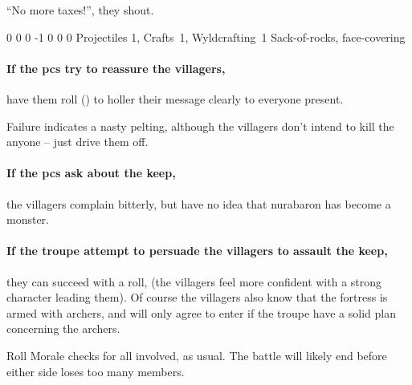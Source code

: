 \begin{multicols}{2}
\begin{boxtext}
  ``No more taxes!'', they shout.
\end{boxtext}

{0}%
{0}%
{{0}%
{-1}%
{0}}%
{0}%
{0}%
{Projectiles 1, Crafts~1, Wyldcrafting~1}%
{Sack-of-rocks, face-covering}%
{}

\paragraph{If the \glspl{pc} try to reassure the villagers,}
have them roll  (\tn[9]) to holler their message clearly to everyone present.

Failure indicates a nasty pelting, although the villagers don't intend to kill the anyone -- just drive them off.

\paragraph{If the \glspl{pc} ask about the keep,}
the villagers complain bitterly, but have no idea that \gls{nurabaron} has become a monster.

\paragraph{If the troupe attempt to persuade the villagers to assault the keep,}
they can succeed with a  roll, \tn[10]
(the villagers feel more confident with a strong character leading them).
Of course the villagers also know that the fortress is armed with archers, and will only agree to enter if the troupe have a solid plan concerning the archers.

Roll Morale checks for all involved, as usual.%
The battle will likely end before either side loses too many members.



\end{multicols}

